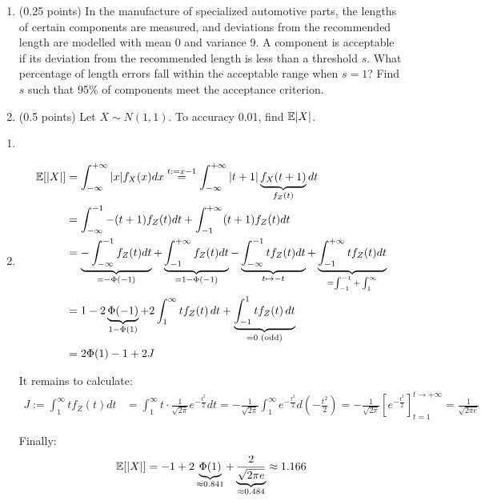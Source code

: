 \documentclass[a4paper]{report}
\begin{document}
\begin{problem}
\begin{enumerate}
    \item (0.25 points)
In the manufacture of specialized automotive parts, the lengths of certain components are measured,
and deviations from the recommended length are modelled with mean 0 and variance 9.
A component is acceptable if its deviation from the recommended length is less than a threshold \(s\).
What percentage of length errors fall within the acceptable range when \(s=1\)?
Find \(s\) such that 95\% of components meet the acceptance criterion.

\item (0.5 points) Let $X\sim N(1,1)$. To accuracy 0.01,
find $\mathbb {E}|X|$.
\end{enumerate}
\end{problem}

\begin{solution}
    \begin{enumerate}
        \item
        \item \begin{align*}
            \mathbb {E}[|X|] &= \int_{-\infty}^{+\infty}|x|f_X(x)dx \stackrel{t := x - 1}{=} \int_{-\infty}^{+\infty}|t+1|\underbrace{f_X(t+1)}_{f_Z(t)}dt \\
            &= \int_{-\infty}^{-1}-(t+1)f_Z(t)dt + \int_{-1}^{+\infty}(t+1)f_Z(t)dt \\
            &= \underbrace{-\int_{-\infty}^{-1}f_Z(t)dt}_{=-\Phi(-1)} + \underbrace{\int_{-1}^{+\infty}f_Z(t)dt}_{=1 - \Phi(-1)} - \underbrace{\int_{-\infty}^{-1}tf_Z(t)dt}_{t \mapsto -t} + \underbrace{\int_{-1}^{+\infty}tf_Z(t)dt}_{=\int_{-1}^{-1} + \int_1^\infty} \\
            &=1-2\underbrace{\Phi(-1)}_{1-\Phi(1)}+2\int_1^\infty tf_Z(t)\,dt+\underbrace{\int_{-1}^1tf_Z(t)\,dt}_{=0\text{ (odd)}}\\
            &= 2\Phi(1) - 1 + 2J
        \end{align*}

        It remains to calculate:
        \begin{align*}
            J := \int_1^\infty tf_Z(t)dt &= \int_1^\infty t\cdot\frac{1}{\sqrt{2\pi}}e^{-\frac{t^2}{2}}dt = -\frac{1}{\sqrt{2\pi}}\int_1^\infty e^{-\frac{t^2}{2}}d\left(-\frac{t^2}{2}\right) = -\frac{1}{\sqrt{2\pi}}\left[e^{-\frac{t^2}{2}}\right]_{t=1}^{t\to+\infty} = \frac{1}{\sqrt{2\pi e}}
        \end{align*}

        Finally:
        \[\mathbb {E}[|X|] = -1 + 2\underbrace{\Phi(1)}_{\approx 0.841} + \underbrace{\frac{2}{\sqrt{2\pi e}}}_{\approx 0.484} \approx 1.166\]
    \end{enumerate}
\end{solution}
\end{document}
